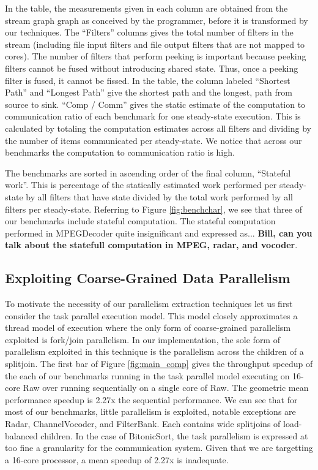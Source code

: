 In the table, the measurements given in each column are obtained from
the stream graph graph as conceived by the programmer, before it is
transformed by our techniques.  The ``Filters'' columns gives the
total number of filters in the stream (including file input filters
and file output filters that are not mapped to cores).  The number of
filters that perform peeking is important because peeking filters
cannot be fused without introducing shared state.  Thus, once a
peeking filter is fused, it cannot be fissed. In the table, the column
labeled ``Shortest Path'' and ``Longest Path'' give the shortest path
and the longest, path from source to sink. ``Comp / Comm'' gives the
static estimate of the computation to communication ratio of each
benchmark for one steady-state execution. This is calculated by
totaling the computation estimates across all filters and dividing by
the number of items communicated per steady-state. We notice that
across our benchmarks the computation to communication ratio is high.

The benchmarks are sorted in ascending order of the final column,
``Stateful work''. This is percentage of the statically estimated work
performed per steady-state by all filters that have state divided by
the total work performed by all filters per steady-state.  Referring
to Figure \ref{fig:benchchar}, we see that three of our benchmarks
include stateful computation.  The stateful computation performed in
MPEGDecoder quite insignificant and expressed as...
\textbf{Bill, can you talk about the statefull computation in
MPEG, radar, and vocoder}.


\begin{figure*}[t]
\centering
{}
\caption{Task, Task + Data, and Task + Data + Software Pipeline
\protect\label{fig:main_comp}}
\end{figure*}

\subsection{Exploiting Coarse-Grained Data Parallelism}
To motivate the necessity of our parallelism extraction techniques let
us first consider the task parallel execution model.  This model
closely approximates a thread model of execution where the only form
of coarse-grained parallelism exploited is fork/join parallelism.  In
our implementation, the sole form of parallelism exploited in this
technique is the parallelism across the children of a splitjoin. The
first bar of Figure \ref{fig:main_comp} gives the throughput speedup
of the each of our benchmarks running in the task parallel model
executing on 16-core Raw over running sequentially on a single core of
Raw.  The geometric mean performance speedup is 2.27x the sequential
performance. We can see that for most of our benchmarks, little
parallelism is exploited, notable exceptions are Radar,
ChannelVocoder, and FilterBank.  Each contains wide splitjoins of
load-balanced children.  In the case of BitonicSort, the task
parallelism is expressed at too fine a granularity for the
communication system.  Given that we are targetting a 16-core
processor, a mean speedup of 2.27x is inadequate.

